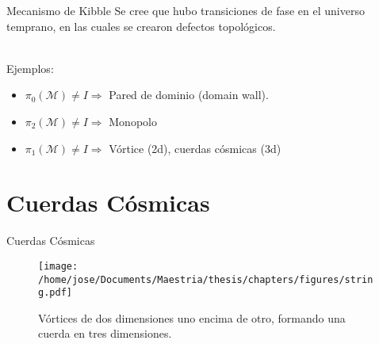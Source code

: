 \documentclass[14pt]{beamer}
\begin{document}
\begin{frame}{Mecanismo de Kibble}
Se cree que hubo transiciones de fase en el universo temprano, en las cuales se crearon defectos topológicos. \\~\

Ejemplos:\\
\begin{itemize}
	\item $\pi_0(\mathcal{M}) \neq I \Rightarrow$ Pared de dominio (domain wall). 
	\item $\pi_2(\mathcal{M}) \neq I\Rightarrow$ Monopolo 
	\item $\pi_1(\mathcal{M}) \neq I\Rightarrow$ Vórtice (2d), cuerdas cósmicas (3d) 
\end{itemize}

\end{frame}


\section{Cuerdas Cósmicas}
\begin{frame}{Cuerdas Cósmicas}
\begin{figure}
	\centering
	\texttt{[image: /home/jose/Documents/Maestria/thesis/chapters/figures/string.pdf]}
	\caption{Vórtices de dos dimensiones uno encima de otro, formando una cuerda en tres dimensiones.}
	\label{fig:string}
\end{figure}
\end{frame}
\end{document}
